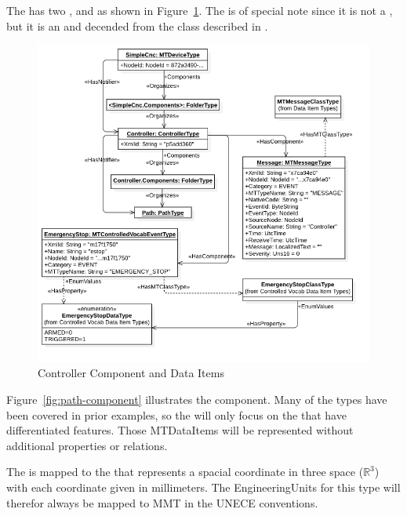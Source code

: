 The  has two ,  and  as shown in Figure~\ref{fig:controller-component}. The  is of special note since it is not a , but it is an  and decended from the  class described in \cite{UAPart5}.

\begin{figure}[ht]
  \centering
  \includegraphics[width=1.0\textwidth]{diagrams/mtconnect-mapping/controller-component.png}
  \caption{Controller Component and Data Items}
  \label{fig:controller-component}
\end{figure}

Figure~\ref{fig:path-component} illustrates the  component. Many of the  types have been covered in prior examples, so the  will only focus on the  that have differentiated features. Those \glspl{MTDataItem} will be represented without additional properties or relations.

The  is mapped to the  that represents a spacial coordinate in three space ($\mathbb{R}^{3}$) with each coordinate given in millimeters. The EngineeringUnits for this type will therefor always be mapped to MMT in the UNECE conventions.

